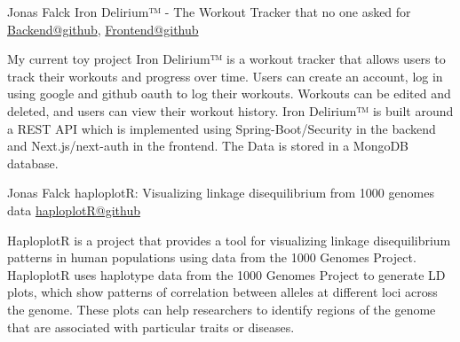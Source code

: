 

\begin{cventries}
  \cventry
  {Jonas Falck}
  {Iron Delirium™ - The Workout Tracker that no one asked for} %
  {\href{https://github.com/joe-nas/workout-app}{Backend@github},
  \href{https://github.com/joe-nas/workout-app-frontend-next}{Frontend@github}}
  {} %
  {    
  \begin{cvitems} %
    \item {My current toy project Iron Delirium™ is a workout tracker that allows users to track their workouts and progress over time. Users can create an account, log in using google and github oauth to log their workouts. Workouts can be edited and deleted, and users can view their workout history. Iron Delirium™ is built around a REST API which is implemented using Spring-Boot/Security in the backend and Next.js/next-auth in the frontend. The Data is stored in a MongoDB database.}
  \end{cvitems}
  }
  
\cventry
  {Jonas Falck}
  {haploplotR: Visualizing linkage disequilibrium from 1000 genomes data} %
  {\href{http://github.com/joe-nas/haploplotR}{haploplotR@github}} %
  {} %
  {    
  \begin{cvitems} %
    \item {HaploplotR is a project that provides a tool for visualizing linkage disequilibrium patterns in human populations using data from the 1000 Genomes Project. 
    HaploplotR uses haplotype data from the 1000 Genomes Project to generate LD plots, which show patterns of correlation between alleles at different loci across the genome. 
    These plots can help researchers to identify regions of the genome that are associated with particular traits or diseases.}
  \end{cvitems}
  }

  

\end{cventries}